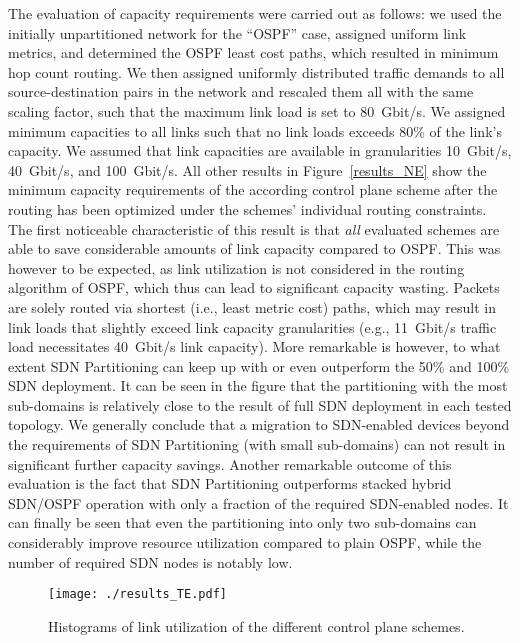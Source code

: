 \documentclass[journal]{IEEEtran}
\begin{document}
The evaluation of capacity requirements were carried out as follows: we used the initially unpartitioned network for the ``OSPF'' case, assigned uniform link metrics, and determined the OSPF least cost paths, which resulted in minimum hop count routing. We then assigned uniformly distributed traffic demands to all source-destination pairs in the network and rescaled them all with the same scaling factor, such that the maximum link load is set to 80~Gbit/s. We assigned  minimum capacities to all links such that no link loads exceeds 80\% of the link's capacity. We assumed that link capacities are available in granularities 10~Gbit/s, 40~Gbit/s, and 100~Gbit/s. All other results in Figure~\ref{results_NE} show the minimum capacity requirements of the according control plane scheme after the routing has been optimized under the schemes' individual routing constraints. The first noticeable characteristic of this result is that \emph{all} evaluated schemes are able to save considerable amounts of link capacity compared to OSPF. This was however to be expected, as link utilization is not considered in the routing algorithm of OSPF, which thus can lead to significant capacity wasting. Packets are solely routed via shortest (i.e., least metric cost) paths, which may result in link loads that slightly exceed link capacity granularities (e.g., 11~Gbit/s traffic load necessitates 40~Gbit/s link capacity). More remarkable is however, to what extent SDN Partitioning can keep up with or even outperform the 50\% and 100\% SDN deployment. It can be seen in the figure that the partitioning with the most sub-domains is relatively close to the result of full SDN deployment in each tested topology. We generally conclude that a migration to SDN-enabled devices beyond the requirements of SDN Partitioning (with small sub-domains) can not result in significant further capacity savings. Another remarkable outcome of this evaluation is the fact that SDN Partitioning outperforms stacked hybrid SDN/OSPF operation with only a fraction of the required SDN-enabled nodes. It can finally be seen that even the partitioning into only two sub-domains can considerably improve resource utilization compared to plain OSPF, while the number of required SDN nodes is notably low.

\begin{figure}[t] \center
\texttt{[image: ./results\_TE.pdf]}
\caption{Histograms of link utilization of the different control plane schemes.}
\label{results_TE} \end{figure}
\end{document}
